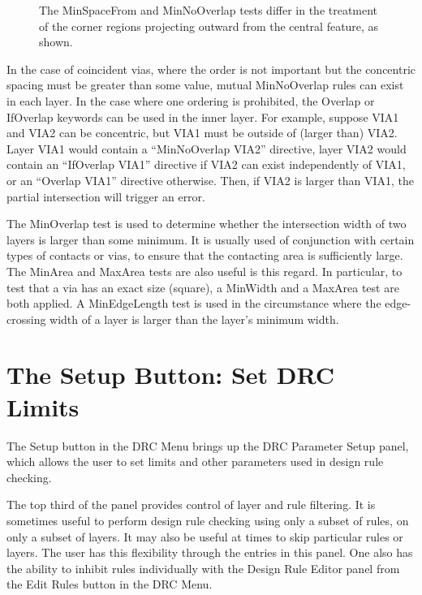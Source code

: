 \begin{figure}
\caption{\label{viatest}The {\et MinSpaceFrom} and {\et MinNoOverlap}
tests differ in the treatment of the corner regions projecting outward
from the central feature, as shown.}
\vspace{1.5ex}
\begin{center}
\end{center}
\end{figure}

In the case of coincident vias, where the order is not important but
the concentric spacing must be greater than some value, mutual {\et
MinNoOverlap} rules can exist in each layer.  In the case where one
ordering is prohibited, the {\et Overlap} or {\et IfOverlap} keywords
can be used in the inner layer.  For example, suppose VIA1 and VIA2
can be concentric, but VIA1 must be outside of (larger than) VIA2. 
Layer VIA1 would contain a ``{\vt MinNoOverlap VIA2}'' directive,
layer VIA2 would contain an ``{\vt IfOverlap VIA1}'' directive if VIA2
can exist independently of VIA1, or an ``{\vt Overlap VIA1}''
directive otherwise.  Then, if VIA2 is larger than VIA1, the partial
intersection will trigger an error.

The {\et MinOverlap} test is used to determine whether the
intersection width of two layers is larger than some minimum.  It is
usually used of conjunction with certain types of contacts or vias, to
ensure that the contacting area is sufficiently large.  The {\et MinArea}
and {\et MaxArea} tests are also useful is this regard.  In particular,
to test that a via has an exact size (square), a {\et MinWidth} and
a {\et MaxArea} test are both applied.  A {\et MinEdgeLength} test is
used in the circumstance where the edge-crossing width of a layer is
larger than the layer's minimum width.


\section{The {\cb Setup} Button: Set DRC Limits}
The {\cb Setup} button in the {\cb DRC Menu} brings up the {\cb DRC
Parameter Setup} panel, which allows the user to set limits and other
parameters used in design rule checking.

The top third of the panel provides control of layer and rule
filtering.  It is sometimes useful to perform design rule checking
using only a subset of rules, on only a subset of layers.  It may also
be useful at times to skip particular rules or layers.  The user has
this flexibility through the entries in this panel.  One also has the
ability to inhibit rules individually with the {\cb Design Rule
Editor} panel from the {\cb Edit Rules} button in the {\cb DRC Menu}.

